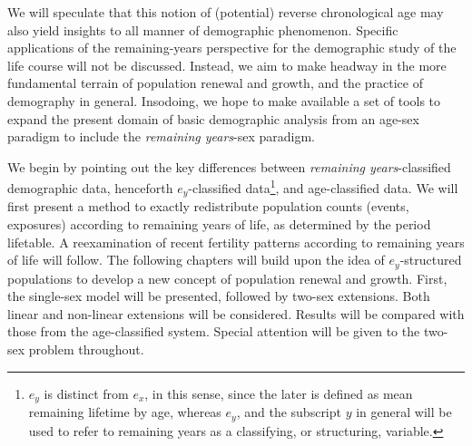We will speculate that this notion of (potential) reverse chronological age may
also yield insights to all manner of demographic phenomenon. Specific
applications of the remaining-years perspective for the demographic study 
of the life course will not be discussed. Instead, we aim to make headway in 
the more fundamental terrain of population renewal and growth, and the practice of demography in general.
Insodoing, we hope to make available a set of tools to expand the present domain
of basic demographic analysis from an age-sex paradigm to include the
\textit{remaining years}-sex paradigm.

We begin by pointing out the key differences
between \textit{remaining years}-classified demographic data,
henceforth $e_y$-classified data\footnote{$e_y$ is distinct from $e_x$, in
this sense, since the later is defined as mean remaining lifetime by age,
whereas $e_y$, and the subscript $y$ in general will be used to refer to
remaining years as a classifying, or structuring, variable.}, and age-classified
data. We will first present a method to exactly redistribute population 
counts (events, exposures) according to remaining years of life, as determined
by the period lifetable. A reexamination of recent fertility patterns according
to remaining years of life will follow. The following chapters will build upon 
the idea of $e_y$-structured populations
to develop a new concept of population renewal and growth. First, the single-sex
model will be presented, followed by two-sex extensions. Both linear and
non-linear extensions will be considered. Results will be compared with those
from the age-classified system. Special attention will be given to the two-sex
problem throughout.


